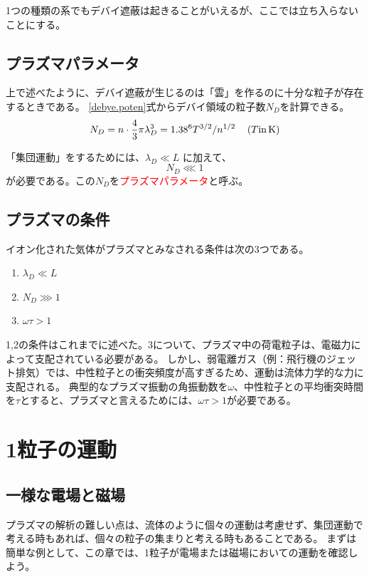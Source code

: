 \documentclass{ltjsarticle}
\numberwithin{equation}{section} %
\begin{document}
1つの種類の系でもデバイ遮蔽は起きることがいえるが、ここでは立ち入らないことにする。

\subsection{プラズマパラメータ}
上で述べたように、デバイ遮蔽が生じるのは「雲」を作るのに十分な粒子が存在するときである。
\eqref{debye.poten}式からデバイ領域の粒子数$N_D$を計算できる。
\begin{equation}
  N_D = n\cdot \frac{4}{3}\pi \lambda_D ^3 = 1.38 \time 10^6T^{3/2}/n^{1/2} \hspace{1pc}(T\text{in}\, \si{\kelvin})
\end{equation}

「集団運動」をするためには、$\lambda_D \ll L$ に加えて、
\begin{equation}
  N_D \lll 1
\end{equation}
が必要である。この$N_D$を\textcolor{red}{プラズマパラメータ}と呼ぶ。

\subsection{プラズマの条件}
イオン化された気体がプラズマとみなされる条件は次の3つである。
\begin{enumerate}
  \item $\lambda_D \ll L$
  \item $N_D \ggg 1$
  \item $\omega \tau > 1$
\end{enumerate}
1,2の条件はこれまでに述べた。3について、プラズマ中の荷電粒子は、電磁力によって支配されている必要がある。
しかし、弱電離ガス（例：飛行機のジェット排気）では、中性粒子との衝突頻度が高すぎるため、運動は流体力学的な力に支配される。
典型的なプラズマ振動の角振動数を$\omega$、中性粒子との平均衝突時間を$\tau$とすると、プラズマと言えるためには、$\omega \tau > 1$が必要である。

\section{1粒子の運動}
\subsection{一様な電場と磁場}
プラズマの解析の難しい点は、流体のように個々の運動は考慮せず、集団運動で考える時もあれば、個々の粒子の集まりと考える時もあることである。
まずは簡単な例として、この章では、1粒子が電場または磁場においての運動を確認しよう。
\end{document}
